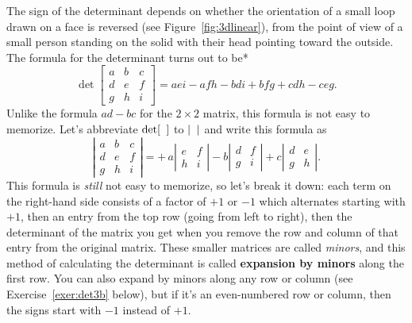 \documentclass{watsonbook}
\begin{document}
The sign of the determinant depends on whether the orientation of a
small loop drawn on a face is reversed (see
Figure~\ref{fig:3dlinear}), from the point of view of a small person
standing on the solid with their head pointing toward the outside. The
formula for the determinant turns out to be*
\[
  \det \left[
    \begin{array}{ccc}
      a & b & c \\ d & e & f \\ g & h & i
    \end{array}
  \right] = 
  aei - afh - bdi + bfg + cdh - ceg. 
\]
Unlike the formula $ad - bc$ for the $2\times 2$ matrix, this formula
is not easy to memorize. Let's abbreviate $\det [ \hphantom{a} ]$ to
$| \hphantom{a}|$ and write this formula as
\[
  \left|\begin{array}{ccc} a & b & c \\ d & e & f \\ g & h & i \end{array}\right| = 
  +\hspace{2pt}a \left|\begin{array}{cc} e & f \\  h & i \end{array}\right| 
  -b \left|\begin{array}{cc} d & f \\  g & i \end{array}\right| 
  +c \left|\begin{array}{cc} d & e \\  g & h \end{array}\right|. 
\]
This formula is \textit{still} not easy to memorize, so let's break it
down: each term on the right-hand side consists of a factor of $+1$ or
$-1$ which alternates starting with $+1$, then an entry from the top
row (going from left to right), then the determinant of the matrix you
get when you remove the row and column of that entry from the original
matrix. These smaller matrices are called \textit{minors}, and this
method of calculating the determinant is called \textbf{expansion by
  minors} along the first row. You can also expand by minors along any
row or column (see Exercise~\ref{exer:det3b} below), but if it's an
even-numbered row or column, then the signs start with $-1$ instead of
$+1$.
\end{document}
